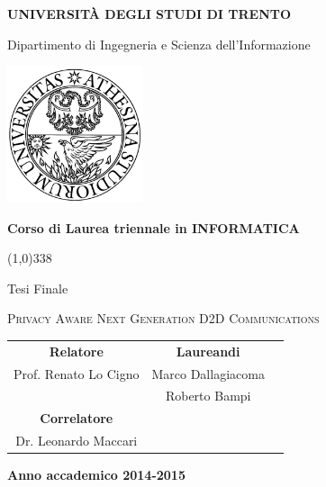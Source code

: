 \begin{titlepage}
  \pagestyle{empty}

  \begin{center}
    {\bfseries
      \Large {\huge U}NIVERSITÀ DEGLI STUDI DI {\huge T}RENTO}

    \vspace{0.2cm}

    {\Large Dipartimento di Ingegneria e Scienza dell'Informazione}

    \vspace{0.5cm}

    \begin{center}
      \includegraphics[width=0.3\textwidth]{img/logo_unitn.png}
    \end{center}

    \vspace{0.5cm}

    {\bfseries \Large Corso di Laurea triennale in INFORMATICA}

    \vspace{0.3cm}
    \line(1,0){338}
    \vspace{0.3cm}

    {\Large Tesi Finale}

    \vspace{2.5cm}

    {\huge \textsc{Privacy Aware Next Generation D2D Communications}\\}

    \vspace{3.0cm}

    \large
    \begin{center}
      \begin{tabular}{ccc}
        {\bfseries Relatore} &
        \hspace{5cm}
        {\bfseries Laureandi} \\

        Prof. Renato Lo Cigno &
        \hspace{5cm} Marco Dallagiacoma \\
        & \hspace{5cm} Roberto Bampi \\
        
        {\bfseries Correlatore} &  \\
        Dr. Leonardo Maccari & \\

      \end{tabular}
    \end{center}
    \vspace{2cm}

    {\bfseries Anno accademico 2014-2015}
    \vfill
  \end{center}
\end{titlepage}
